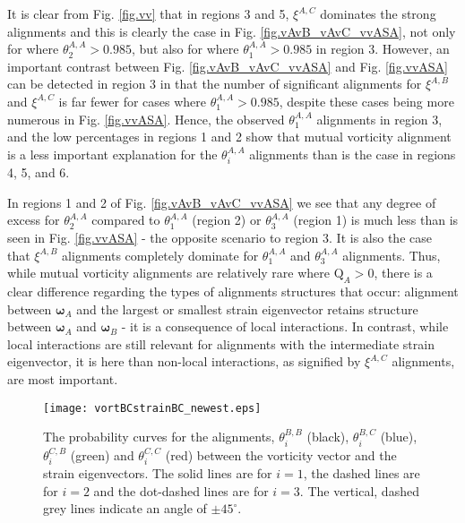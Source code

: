 \documentclass[preprint,amssymb,amsmath,aip,cha]{revtex4-1}
\begin{document}
It is clear from Fig. \ref{fig.vv} that in regions 3 and 5, $\xi^{A,C}$ dominates the strong alignments and this is clearly the case in Fig. \ref{fig.vAvB_vAvC_vvASA}, not only for where $\theta^{A,A}_{2} > 0.985$, but also for where $\theta^{A,A}_{1} > 0.985$ in region 3. However, an important contrast between Fig. \ref{fig.vAvB_vAvC_vvASA} and Fig. \ref{fig.vvASA} can be detected in region 3 in that the number of significant alignments for  $\xi^{A,B}$ and $\xi^{A,C}$ is far fewer for cases where $\theta^{A,A}_{1} > 0.985$, despite these cases being more numerous in Fig. \ref{fig.vvASA}. Hence, the observed $\theta^{A,A}_{1}$ alignments in region 3, and the low percentages in regions 1 and 2 show that mutual vorticity alignment is a less important explanation for the $\theta^{A,A}_{i}$ alignments than is the case in regions 4, 5, and 6. 

In regions 1 and 2 of Fig. \ref{fig.vAvB_vAvC_vvASA} we see that any degree of excess for $\theta^{A,A}_{2}$ compared to $\theta^{A,A}_{1}$ (region 2) or $\theta^{A,A}_{3}$ (region 1) is much less than is seen in Fig. \ref{fig.vvASA} - the opposite scenario to region 3. It is also the case that $\xi^{A,B}$ alignments completely dominate for $\theta^{A,A}_{1}$ and $\theta^{A,A}_{3}$ alignments. Thus, while mutual vorticity alignments are relatively rare where $\mbox{Q}_{A} > 0$, there is a clear difference regarding the types of alignments structures that occur: alignment between $\boldsymbol{\omega}_{A}$ and the largest or smallest strain eigenvector retains structure between $\boldsymbol{\omega}_{A}$ and $\boldsymbol{\omega}_{B}$ - it is a consequence of local interactions. In contrast, while local interactions are still relevant for alignments with the intermediate strain eigenvector, it is here than non-local interactions, as signified by $\xi^{A,C}$ alignments, are most important.

\begin{figure*}
  \texttt{[image: vortBCstrainBC\_newest.eps]}
\caption{The probability curves for the alignments, $\theta^{B,B}_{i}$ (black), $\theta^{B,C}_{i}$ (blue), $\theta^{C,B}_{i}$ (green) and $\theta^{C,C}_{i}$ (red) between the vorticity vector and the strain eigenvectors. The solid lines are for $i =1$, the dashed lines are for $i = 2$ and the dot-dashed lines are for $i = 3$. The vertical, dashed grey lines indicate an angle of $\pm 45^{\circ}$.
}
\label{fig.vsBC}   
\end{figure*}
\end{document}
